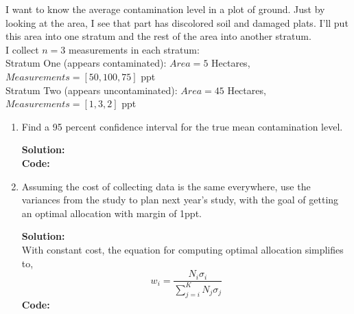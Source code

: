 \documentclass[12pt]{article}
\makeatletter
\theoremstyle{homework}
\newenvironment{exercise}[1]
{\def\@currentlabel{#1}\exercisecore}
{\endexercisecore}
\newcommand{\localhead}[1]{\par\smallskip\noindent\textbf{#1}\nobreak\\}%
\newcommand\solution{\localhead{Solution:}}
\makeatother
\begin{document}
\begin{exercise}{2} I want to know the average contamination level in a plot of ground. 
    Just by looking at the area, I see that part has discolored soil and damaged plats. I'll put 
    this area into one stratum and the rest of the area into another stratum. \\
    I collect $n = 3$ measurements in each stratum:\\
    Stratum One (appears contaminated): $Area = 5$ Hectares, $Measurements = [50, 100 ,75]$ ppt\\
    Stratum Two (appears uncontaminated): $Area = 45$ Hectares, $Measurements = [1, 3 ,2]$ ppt\\
    
    \begin{enumerate}
        \item Find a 95 percent confidence interval for the true mean contamination level.\\
        \solution  
        \textbf{Code:}
        \begin{center}
            
        \end{center}
        \vspace{.15in}

        \item Assuming the cost of collecting data is the same everywhere, use the 
        variances from the study to plan next year's study, with the goal of getting an optimal 
        allocation with margin of 1ppt.\\
        \solution With constant cost, the equation for computing optimal allocation simplifies to, 
        \begin{equation*}
            w_i = \dfrac{N_i \sigma_i}{\sum_{j = i}^K N_j\sigma_j}
        \end{equation*} 
        \textbf{Code:}
        \begin{center}
            
        \end{center}
        \vspace{.15in}
    \end{enumerate}
\end{exercise}
\vspace{1in}
\end{document}
